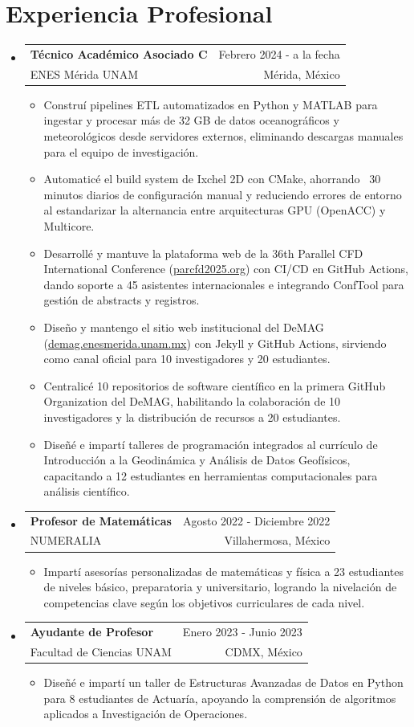 \documentclass[10pt, letterpaper]{article}
\makeatletter
\newcommand{\CVitem}[1]{
	\item \small{#1}
}
\newcommand{\CVListStart}{\begin{itemize}[leftmargin=0cm, label={}]}
\newcommand{\CVListEnd}{\end{itemize}}
\newcommand{\CVSubHeading}[4]{
	\item \begin{tabular*}{19.5cm}[t]{l@{\extracolsep{\fill}}r}
		\textbf{#1} & #2 \\
		\small #3 & \small #4 \\
	\end{tabular*} \vspace{-4pt}
}
\newcommand{\CVItemizeStart}{\begin{itemize}[rightmargin=1cm, label={\tiny \textbullet}]}
\newcommand{\CVItemizeEnd}{\end{itemize}}
\makeatother
\begin{document}
\section{Experiencia Profesional}
\CVListStart
\CVSubHeading{\small Técnico Académico Asociado C}{Febrero 2024 - a la fecha}{ENES Mérida UNAM}{Mérida, México}
\CVItemizeStart
\CVitem{Construí pipelines ETL automatizados en Python y MATLAB para ingestar y procesar más de 32 GB de datos oceanográficos y meteorológicos desde servidores externos, eliminando descargas manuales para el equipo de investigación.}
\CVitem{Automaticé el build system de Ixchel 2D con CMake, ahorrando ~30 minutos diarios de configuración manual y reduciendo errores de entorno al estandarizar la alternancia entre arquitecturas GPU (OpenACC) y Multicore.}
\CVitem{Desarrollé y mantuve la plataforma web de la 36th Parallel CFD International Conference (\href{https://www.parcfd2025.org/}{parcfd2025.org}) con CI/CD en GitHub Actions, dando soporte a 45 asistentes internacionales e integrando ConfTool para gestión de abstracts y registros.}
\CVitem{Diseño y mantengo el sitio web institucional del DeMAG (\href{https://www.demag.enesmerida.unam.mx/}{demag.enesmerida.unam.mx}) con Jekyll y GitHub Actions, sirviendo como canal oficial para 10 investigadores y 20 estudiantes.}
\CVitem{Centralicé 10 repositorios de software científico en la primera GitHub Organization del DeMAG, habilitando la colaboración de 10 investigadores y la distribución de recursos a 20 estudiantes.}
\CVitem{Diseñé e impartí talleres de programación integrados al currículo de Introducción a la Geodinámica y Análisis de Datos Geofísicos, capacitando a 12 estudiantes en herramientas computacionales para análisis científico.}
\CVItemizeEnd

\CVSubHeading{\small Profesor de Matemáticas}{Agosto 2022 - Diciembre 2022}{NUMERALIA}{Villahermosa, México}
\CVItemizeStart
\CVitem{Impartí asesorías personalizadas de matemáticas y física a 23 estudiantes de niveles básico, preparatoria y universitario, logrando la nivelación de competencias clave según los objetivos curriculares de cada nivel.}
\CVItemizeEnd

\CVSubHeading{\small Ayudante de Profesor}{ Enero 2023 - Junio 2023}{Facultad de Ciencias UNAM}{CDMX, México}
\CVItemizeStart
\CVitem{Diseñé e impartí un taller de Estructuras Avanzadas de Datos en Python para 8 estudiantes de Actuaría, apoyando la comprensión de algoritmos aplicados a Investigación de Operaciones.}
\CVItemizeEnd

\CVListEnd
\end{document}

